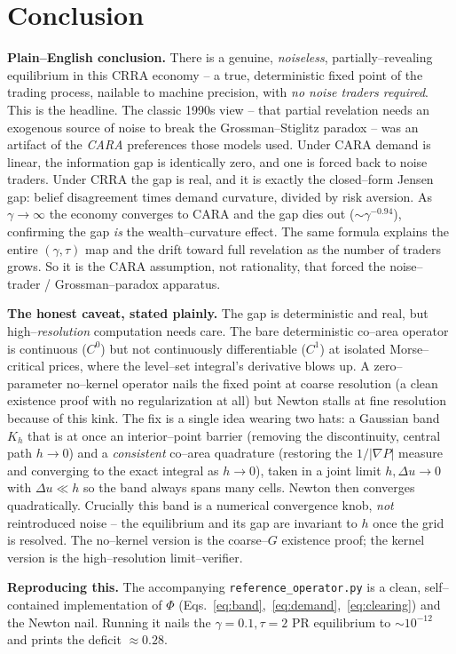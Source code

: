 \documentclass[11pt]{article}
\newcommand{\grad}{\nabla}
\begin{document}
\section{Conclusion}

\textbf{Plain--English conclusion.}
There is a genuine, \emph{noiseless}, partially--revealing equilibrium in this
CRRA economy -- a true, deterministic fixed point of the trading process,
nailable to machine precision, with \emph{no noise traders required}. This is
the headline. The classic 1990s view -- that partial revelation needs an
exogenous source of noise to break the Grossman--Stiglitz paradox -- was an
artifact of the \emph{CARA} preferences those models used. Under CARA demand
is linear, the information gap is identically zero, and one is forced back to
noise traders. Under CRRA the gap is real, and it is exactly the closed--form
Jensen gap: belief disagreement times demand curvature, divided by risk
aversion. As $\gamma\to\infty$ the economy converges to CARA and the gap dies
out ($\sim\gamma^{-0.94}$), confirming the gap \emph{is} the wealth--curvature
effect. The same formula explains the entire $(\gamma,\tau)$ map and the drift
toward full revelation as the number of traders grows. So it is the CARA
assumption, not rationality, that forced the noise--trader / Grossman--paradox
apparatus.

\textbf{The honest caveat, stated plainly.} The gap is deterministic and real,
but high--\emph{resolution} computation needs care. The bare deterministic
co--area operator is continuous ($C^0$) but not continuously differentiable
($C^1$) at isolated Morse--critical prices, where the level--set integral's
derivative blows up. A zero--parameter no--kernel operator nails the fixed
point at coarse resolution (a clean existence proof with no regularization at
all) but Newton stalls at fine resolution because of this kink. The fix is a
single idea wearing two hats: a Gaussian band $K_h$ that is at once an
interior--point barrier (removing the discontinuity, central path $h\to0$) and
a \emph{consistent} co--area quadrature (restoring the $1/|\grad P|$ measure
and converging to the exact integral as $h\to0$), taken in a joint limit
$h,\Delta u\to0$ with $\Delta u\ll h$ so the band always spans many cells.
Newton then converges quadratically. Crucially this band is a numerical
convergence knob, \emph{not} reintroduced noise -- the equilibrium and its gap
are invariant to $h$ once the grid is resolved. The no--kernel version is the
coarse--$G$ existence proof; the kernel version is the high--resolution
limit--verifier.

\vspace{1em}
\noindent\textbf{Reproducing this.} The accompanying
\texttt{reference\_operator.py} is a clean, self--contained implementation of
$\Phi$ (Eqs.~\ref{eq:band},~\ref{eq:demand},~\ref{eq:clearing}) and the
Newton nail. Running it nails the $\gamma=0.1,\tau=2$ PR equilibrium to
$\sim10^{-12}$ and prints the deficit $\approx0.28$.
\end{document}
